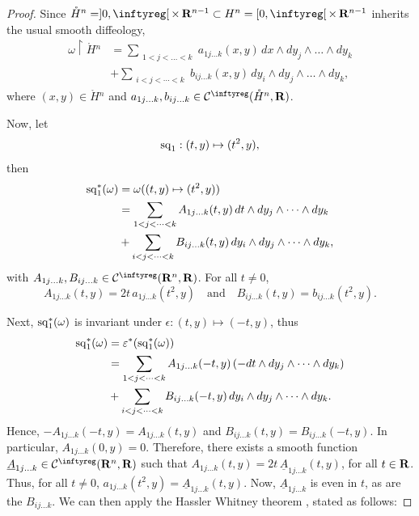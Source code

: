 \begin{proof}
  Since $\mathring{H}{}^n = ]0,\infty[ \,\times\, \RR^{n-1} \subset H^n = [0,\infty[ \,\times\, \RR^{n-1}$ inherits the usual smooth diffeology,
  \begin{align*}
    \omega \restriction \mathring{H}{}^n & = \sum_{\substack{1<j<\dots<k}} a_{1j\dots k}(x,y) \, dx \wedge dy_j \wedge \dots \wedge dy_k \\
    & + \sum_{\substack{i<j<\cdots<k}} b_{ij\dots k}(x,y) \, dy_i \wedge dy_j \wedge \dots \wedge dy_k,
  \end{align*}
  where $(x,y) \in \mathring{H}{}^n$ and $a_{1j\dots k}, b_{ij\dots k} \in \Cinfty(\mathring{H}{}^n,\RR)$.
  
  Now,
  let
  $$
    {\operatorname{sq}}_1 : (t,y) \mapsto (t^2,y),
  $$
  then
  \begin{align*}
    {\operatorname{sq}}_1^*(\omega) & = \omega((t,y) \mapsto (t^2,y)) \\
    & = \sum_{\substack{1<j<\dots<k}} A_{1j\dots k}(t,y) \, dt \wedge dy_j \wedge \dots \wedge dy_k \\
    & + \sum_{\substack{i<j<\dots<k}} B_{ij\dots k}(t,y) \, dy_i \wedge dy_j \wedge \dots \wedge dy_k,
  \end{align*}
  with $A_{1j\dots k}, B_{ij\dots k} \in \Cinfty(\RR^n,\RR)$.
  For all $t \neq 0$,
  $$
    A_{1j\dots k}(t,y) = 2t \, a_{1j\dots k}(t^2,y) \quad \text{and} \quad B_{ij\dots k}(t,y) = b_{ij\dots k}(t^2,y).
  $$
  
  Next,
  ${\operatorname{sq}}_1^*(\omega)$ is invariant under $\epsilon : (t,y) \mapsto (-t,y)$,
  thus
  \begin{align*}
    {\operatorname{sq}}_1^*(\omega) & = \varepsilon^*({\operatorname{sq}}_1^*(\omega)) \\
    & = \sum_{\substack{1<j<\dots<k}} A_{1j\dots k}(-t,y) \, (-dt \wedge dy_j \wedge \dots \wedge dy_k) \\
    & + \sum_{\substack{i<j<\dots<k}} B_{ij\dots k}(-t,y) \, dy_i \wedge dy_j \wedge \dots \wedge dy_k.
  \end{align*}
  Hence,
  $-A_{1j\dots k}(-t,y) = A_{1j\dots k}(t,y)$ and $B_{ij\dots k}(t,y) = B_{ij\dots k}(-t,y)$.
  In particular,
  $A_{1j\dots k}(0,y) = 0$.
  Therefore,
  there exists a smooth function $\underline{A}_{1j\dots k} \in \Cinfty(\RR^n,\RR)$ such that $A_{1j\dots k}(t,y) = 2t \,\underline{A}_{1j\dots k}(t,y)$,
  for all $t \in \mathbf{R}$.
  Thus,
  for all $t \neq 0$,
  $a_{1j\dots k}(t^2,y) = \underline{A}_{1j\dots k}(t,y)$.
  Now, $\underline{A}_{1j\dots k}$ is even in $t$,
  as are the $B_{ij\dots k}$.
  We can then apply the Hassler Whitney theorem \cite[Theorem 1 and final remark]{Whi43},
  stated as follows:
  

\end{proof}
